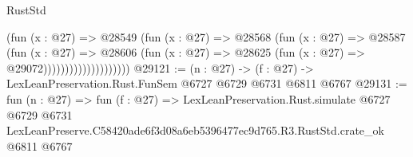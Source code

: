 \begin{lexlean}{RustStd}
\begin{coremodule}
                                (fun (x : @27) =>
                                @28549
                                  (fun (x : @27) =>
                                  @28568
                                    (fun (x : @27) =>
                                    @28587
                                      (fun (x : @27) =>
                                      @28606
                                        (fun (x : @27) =>
                                        @28625 (fun (x : @27) => @29072))))))))))))))))))))
@29121 := (n : @27) -> (f : @27) -> LexLeanPreservation.Rust.FunSem @6727 @6729 @6731 @6811 @6767
@29131 := fun (n : @27) =>
  fun (f : @27) =>
  LexLeanPreservation.Rust.simulate
    @6727
    @6729
    @6731
    LexLeanPreserve.C58420ade6f3d08a6eb5396477ec9d765.R3.RustStd.crate_ok
    @6811
    @6767
\end{coremodule}
\end{lexlean}
